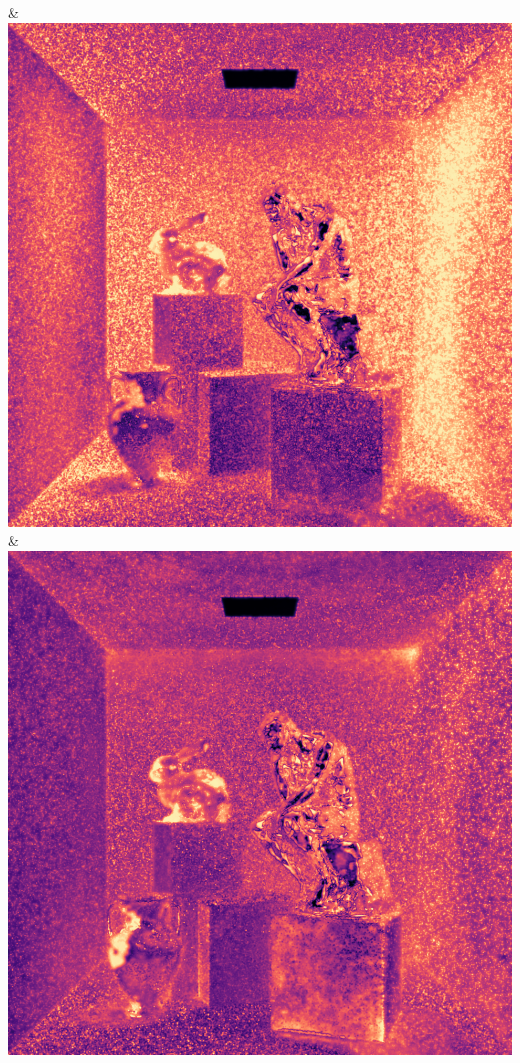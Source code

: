 & \includegraphics[width=\linewidth]{figures/py/tests/path_termination/sah_1spp_thinker_flip.png}
& \includegraphics[width=\linewidth]{figures/py/tests/path_termination/bth_1spp_thinker_flip.png}
